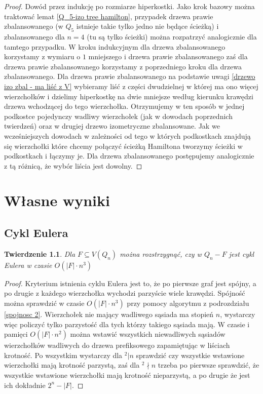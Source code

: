 \documentclass{pracamgr}
\newtheorem{theorem}{Twierdzenie}
\begin{document}
    \begin{proof}
     Dowód przez indukcję po rozmiarze hiperkostki. Jako krok bazowy można traktować lemat \ref{Q_5-izo tree hamilton}, przypadek drzewa prawie zbalansowanego
     (w $Q_5$ istnieje takie tylko jedno nie będące ścieżką) i zbalansowanego dla $n=4$ (tu są tylko ścieżki) można rozpatrzyć analogicznie dla tamtego przypadku.
     W kroku indukcyjnym dla drzewa zbalansowanego korzystamy z wymiaru o $1$ mniejszego i drzewa prawie zbalansowanego 
     zaś dla drzewa prawie zbalansowanego korzystamy z poprzedniego kroku dla drzewa zbalansowanego.
     Dla drzewa prawie zbalansowanego na podstawie uwagi \ref{drzewo izo zbal - ma liść z V} wybieramy liść
     z części dwudzielnej w której ma ono więcej wierzchołków i dzielimy hiperkostkę na dwie mniejsze według kierunku krawędzi drzewa
     wchodzącej do tego wierzchołka. Otrzymujemy w ten sposób w jednej podkostce pojedynczy wadliwy wierzchołek (jak w dowodach poprzednich twierdzeń)
     oraz w drugiej drzewo izometryczne zbalansowane. Jak we wcześniejszych dowodach w zależności od tego w których podkostkach znajdują się wierzchołki
     które chcemy połączyć ścieżką Hamiltona tworzymy ścieżki w podkostkach i łączymy je. Dla drzewa zbalansowanego postępujemy analogicznie z tą różnicą,
     że wybór liścia jest dowolny.
    \end{proof}
 \chapter{Własne wyniki}
  \section{Cykl Eulera}
   \begin{theorem}\label{cykl Eulera}
    Dla $F\subseteq V(Q_n)$ można rozstrzygnąć, czy w $Q_n-F$ jest cykl Eulera w czasie $O(|F|\cdot n^3)$
   \end{theorem}
   \begin{proof}
    Kryterium istnienia cyklu Eulera jest to, że po pierwsze graf jest spójny, a po drugie z każdego wierzchołka wychodzi parzyście wiele krawędzi.
    Spójność można sprawdzić w czasie $O(|F|\cdot n^3)$ przy pomocy algorytmu z podrozdziału \ref{spojnosc 2}.
    Wierzchołek nie mający wadliwego sąsiada ma stopień $n$, wystarczy więc policzyć tylko parzystość dla tych którzy takiego sąsiada mają.
    W czasie i pamięci $O(|F|\cdot n^2)$ można wstawić wszystkich niewadliwych sąsiadów wierzchołków wadliwych
    do drzewa prefiksowego zapamiętując w liściach krotność.
    Po wszystkim wystarczy dla $^2|n$ sprawdzić czy wszystkie wstawione wierzchołki mają krotność parzystą, zaś dla $^2\nmid n$ trzeba po pierwsze sprawdzić,
    że wszystkie wstawione wierzchołki mają krotność nieparzystą, a po drugie że jest ich dokładnie $2^n-|F|$.
   \end{proof}
\end{document}
